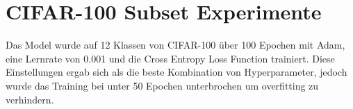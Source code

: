 \section{CIFAR-100 Subset Experimente}\label{section:cifar-experimente}
Das Model wurde auf 12 Klassen von CIFAR-100 über 100 Epochen mit Adam, eine Lernrate von 0.001 und die Cross Entropy Loss Function
trainiert. Diese Einstellungen ergab sich als die beste Kombination von Hyperparameter, jedoch wurde das Training bei unter 50 Epochen unterbrochen
um overfitting zu verhindern.

